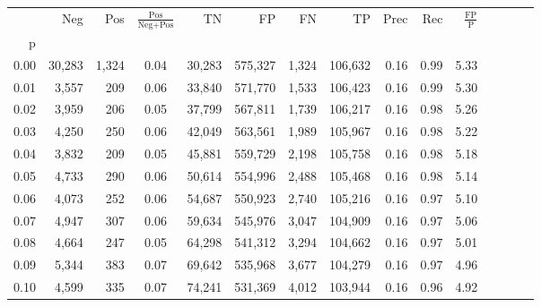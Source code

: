 \begin{tabular}{rrrcrrrrrrrrrrr}
\toprule
{} &     Neg &    Pos & $\frac{\text{Pos}}{\text{Neg}+\text{Pos}}$ &       TN &       FP &       FN &       TP &  Prec &   Rec & $\frac{\text{FP}}{\text{P}}$ \\
p    &         &        &                                            &          &          &          &          &       &       &                              \\
\midrule
0.00 &  30,283 &  1,324 &                                       0.04 &   30,283 &  575,327 &    1,324 &  106,632 &  0.16 &  0.99 &                         5.33 \\
0.01 &   3,557 &    209 &                                       0.06 &   33,840 &  571,770 &    1,533 &  106,423 &  0.16 &  0.99 &                         5.30 \\
0.02 &   3,959 &    206 &                                       0.05 &   37,799 &  567,811 &    1,739 &  106,217 &  0.16 &  0.98 &                         5.26 \\
0.03 &   4,250 &    250 &                                       0.06 &   42,049 &  563,561 &    1,989 &  105,967 &  0.16 &  0.98 &                         5.22 \\
0.04 &   3,832 &    209 &                                       0.05 &   45,881 &  559,729 &    2,198 &  105,758 &  0.16 &  0.98 &                         5.18 \\
0.05 &   4,733 &    290 &                                       0.06 &   50,614 &  554,996 &    2,488 &  105,468 &  0.16 &  0.98 &                         5.14 \\
0.06 &   4,073 &    252 &                                       0.06 &   54,687 &  550,923 &    2,740 &  105,216 &  0.16 &  0.97 &                         5.10 \\
0.07 &   4,947 &    307 &                                       0.06 &   59,634 &  545,976 &    3,047 &  104,909 &  0.16 &  0.97 &                         5.06 \\
0.08 &   4,664 &    247 &                                       0.05 &   64,298 &  541,312 &    3,294 &  104,662 &  0.16 &  0.97 &                         5.01 \\
0.09 &   5,344 &    383 &                                       0.07 &   69,642 &  535,968 &    3,677 &  104,279 &  0.16 &  0.97 &                         4.96 \\
0.10 &   4,599 &    335 &                                       0.07 &   74,241 &  531,369 &    4,012 &  103,944 &  0.16 &  0.96 &                         4.92 \\

\end{tabular}
